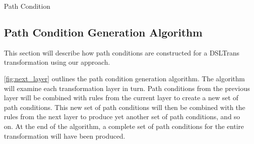 \begin{definition}{Path Condition\\}
\label{def:path_condition}
\end{definition}


\subsection{Path Condition Generation Algorithm}
\label{sec:gen_all_pcs}

 This section will describe how path conditions are constructed for a DSLTrans transformation using our approach.

\cref{fig:next_layer} outlines the path condition generation algorithm. The algorithm will examine each transformation layer in turn. Path conditions from the previous layer will be combined with rules from the current layer to create a new set of path conditions. This new set of path conditions will then be combined with the rules from the next layer to produce yet another set of path conditions, and so on. At the end of the algorithm, a complete set of path conditions for the entire transformation will have been produced. 

